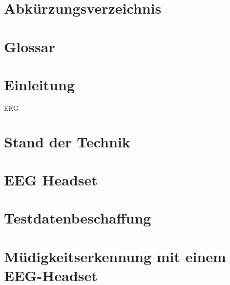 
\graphicspath{{img/}{./}}


\pagestyle{empty}





\cleardoublepage 
\begingroup
\let\clearpage\relax

\chapter*{Abkürzungsverzeichnis}

\chapter*{Glossar}

\endgroup


\pagestyle{WissDokuNorm}

\cleardoublepage


\cleardoublepage
\chapter{Einleitung}
\acl{EEG}


\chapter{Stand der Technik}


\chapter{EEG Headset}


\chapter{Testdatenbeschaffung}


\chapter{Müdigkeitserkennung mit einem EEG-Headset}


